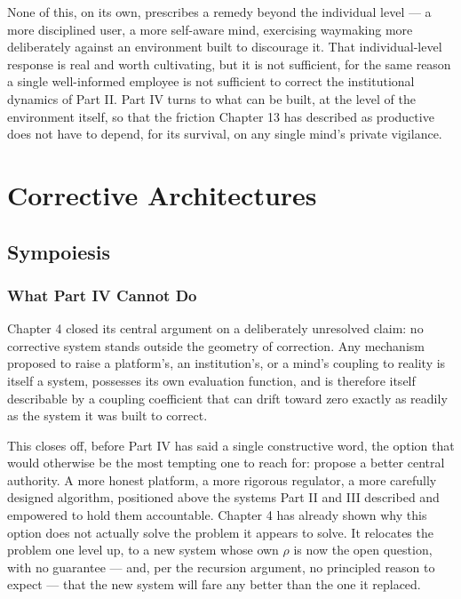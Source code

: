 \documentclass[12pt,a4paper]{book}
\begin{document}
None of this, on its own, prescribes a remedy beyond the individual level — a more disciplined user, a more self-aware mind, exercising waymaking more deliberately against an environment built to discourage it. That individual-level response is real and worth cultivating, but it is not sufficient, for the same reason a single well-informed employee is not sufficient to correct the institutional dynamics of Part II. Part IV turns to what can be built, at the level of the environment itself, so that the friction Chapter 13 has described as productive does not have to depend, for its survival, on any single mind's private vigilance.



\part{Corrective Architectures}

\chapter{Sympoiesis}

\section{What Part IV Cannot Do}

Chapter 4 closed its central argument on a deliberately unresolved claim: no corrective system stands outside the geometry of correction. Any mechanism proposed to raise a platform's, an institution's, or a mind's coupling to reality is itself a system, possesses its own evaluation function, and is therefore itself describable by a coupling coefficient that can drift toward zero exactly as readily as the system it was built to correct.

This closes off, before Part IV has said a single constructive word, the option that would otherwise be the most tempting one to reach for: propose a better central authority. A more honest platform, a more rigorous regulator, a more carefully designed algorithm, positioned above the systems Part II and III described and empowered to hold them accountable. Chapter 4 has already shown why this option does not actually solve the problem it appears to solve. It relocates the problem one level up, to a new system whose own $\rho$ is now the open question, with no guarantee — and, per the recursion argument, no principled reason to expect — that the new system will fare any better than the one it replaced.
\end{document}
